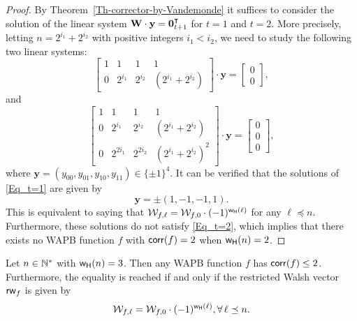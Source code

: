 \documentclass[11pt]{llncs}
\begin{document}
\begin{proof}
	By Theorem~\ref{Th-corrector-by-Vandemonde} it suffices to consider the solution of the linear system $\mathbf{W} \cdot \mathbf{y} = \mathbf{0}_{{t+1}}^{\intercal}$ for $t=1$ and $t=2$.
	More precisely, letting $n=2^{i_1} + 2^{i_2}$ with positive integers $i_1< i_2$, we need to study the following two linear systems:
	\begin{equation}\label{Eq_t=1}
	\begin{bmatrix}
	1 & 1 & 1 & 1 \\
	0 & 2^{i_1} & 2^{i_2} & (2^{i_1}+2^{i_2})
	\end{bmatrix}
	\cdot \mathbf{y} =  \begin{bmatrix}
	0 \\ 0
	\end{bmatrix},
	\end{equation}
	and
	\begin{equation}\label{Eq_t=2}
	\begin{bmatrix}
	1 & 1 & 1 & 1 \\
	0 & 2^{i_1} & 2^{i_2} & (2^{i_1}+2^{i_2}) \\
	0 & 2^{2i_1} & 2^{2i_2} & (2^{i_1}+2^{i_2})^2
	\end{bmatrix}
	\cdot \mathbf{y}  =  \begin{bmatrix}
	0 \\ 0 \\ 0
	\end{bmatrix},
	\end{equation} where $\mathbf{y} = (y_{00},y_{01},y_{10},y_{11})\in \{\pm 1\}^4$.
	It can be verified that the solutions of \eqref{Eq_t=1} are given by
	\[
	\mathbf{y} = \pm (1, -1,-1, 1).
	\] This is equivalent to saying that $\mathcal{W}_{f,\ell} = \mathcal{W}_{f,0} \cdot (-1)^{\mathsf{w_H}(\ell)}$ for any $\ell \preceq n$.
	Furthermore, these solutions do not satisfy \eqref{Eq_t=2}, which implies
	that there exists no WAPB function $f$ with $\mathsf{corr}(f) = 2$ when $\mathsf{w_H}(n) = 2$.
\end{proof}

\begin{proposition}\label{prop:t=3} Let $n\in \mathbb{N}^*$ with $\mathsf{w_H}(n)=3$. Then any WAPB function $f$ has $\mathsf{corr}(f)\leq 2$.
	Furthermore, the equality is reached if and only if the restricted Walsh vector $\mathsf{rw}_{f}$ is given by
	\[
	\mathcal{W}_{f,\ell} =   \mathcal{W}_{f,0} \cdot (-1)^{\mathsf{w_H}(\ell)}, \forall \, \ell \preceq n.
	\]
\end{proposition}

\end{document}
